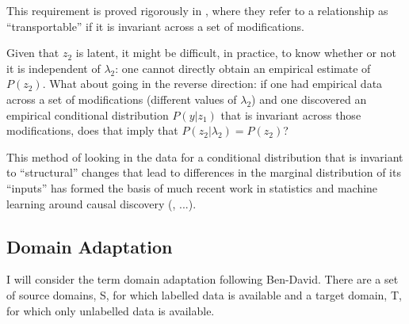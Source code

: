 \documentclass[a4paper,12pt]{article}
\begin{document}
This requirement is proved rigorously in \cite{Pearl2014}, where they refer to a relationship as ``transportable'' if it is invariant across a set of modifications.

Given that $z_2$ is latent, it might be difficult, in practice, to know whether or not it is independent of $\lambda_2$: one cannot directly obtain an empirical estimate of $P(z_2)$. What about going in the reverse direction: if one had empirical data across a set of modifications (different values of $\lambda_2$) and one discovered an empirical conditional distribution $P(y | z_1)$ that is invariant across those modifications, does that imply that $P(z_2 | \lambda_2) = P(z_2)$?

This method of looking in the data for a conditional distribution that is invariant to ``structural'' changes that lead to differences in the marginal distribution of its ``inputs'' has formed the basis of much recent work in statistics and machine learning around causal discovery (\cite{peters2015}, ...).




\subsection*{Domain Adaptation}

I will consider the term domain adaptation following Ben-David. There are a set of source domains, S, for which labelled data is available and a target domain, T, for which only unlabelled data is available. 





\end{document}
